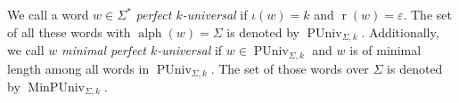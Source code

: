 \documentclass[runningheads,UKenglish,cleveref, autoref, thm-restate]{llncs}
\def\ta{\mathtt{a}}
\def\tb{\mathtt{b}}
\def\tc{\mathtt{c}}
\def\r{\operatorname{r}}
\def\re{\operatorname{r}}
\def\m{\operatorname{m}}
\renewcommand{\epsilon}{\varepsilon}
\DeclareMathOperator{\ar}{ar}
\DeclareMathOperator{\letters}{alph}
\DeclareMathOperator{\PerfUniv}{PUniv}
\DeclareMathOperator{\MinPerfUniv}{MinPUniv}
\newcommand{\rev}[1]{\mathpalette\harpoonvec{#1}}
\newcommand{\harpvecsign}{\scriptscriptstyle\leftharpoonup}
\newcommand{\harpoonvec}[2]{%
	\ifx\displaystyle#1\doalign{$\harpvecsign$}{#1#2}\fi
	\ifx\textstyle#1\doalign{$\harpvecsign$}{#1#2}\fi
	\ifx\scriptstyle#1\doalign{\scalebox{.6}[.9]{$\harpvecsign$}}{#1#2}\fi
	\ifx\scriptscriptstyle#1\doalign{\scalebox{.5}[.8]{$\harpvecsign$}}{#1#2}\fi
}
\newcommand{\doalign}[2]{%
	{\vbox{\offinterlineskip\ialign{\hfil##\hfil\cr#1\cr$#2$\cr}}}%
}
\DeclareMathOperator\w{\rev\m}
\DeclareMathOperator\ra{\rev\ar}
\DeclareMathOperator\er{\rev\r}
\newcommand{\todoah}[1]{\todo[color=violet,inline, textcolor = white]{#1}}
\begin{document}
\begin{definition}
	We call a word $w \in \Sigma^*$ \emph{perfect $k$-universal} if $\iota(w)=k$ and $\r(w) = \epsilon$. The set of all these words with $\letters(w)=\Sigma$ is denoted by $\PerfUniv_{\Sigma,k}$.
	Additionally, we call $w$ \emph{minimal perfect $k$-universal} if $w\in\PerfUniv_{\Sigma,k}$ and $w$ is of minimal length among all words in $\PerfUniv_{\Sigma,k}$.
	The set of those words over $\Sigma$ is denoted by $\MinPerfUniv_{\Sigma,k}$.
\end{definition}

%
%
%
\end{document}
